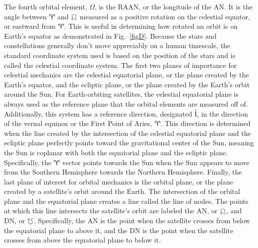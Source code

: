 \documentclass[conference]{IEEEtran}
\newcommand{\vhat}[1]{\hat{\bm{\mathrm{#1}}}}
\begin{document}
			The fourth orbital element, \( \Omega \), is the RAAN, or the longitude of the AN\@. It is the angle between \( \aries \) and \( \ascnode \) measured as a positive rotation on the celestial equator, or eastward from \( \aries \). This is useful in determining how rotated an orbit is on Earth's equator as demonstrated in Fig.~\ref{figD}. Because the stars and constellations generally don't move appreciably on a human timescale, the standard coordinate system used is based on the position of the stars and is called the celestial coordinate system. The first two planes of importance for celestial mechanics are the celestial equatorial plane, or the plane created by the Earth's equator, and the ecliptic plane, or the plane created by the Earth's orbit around the Sun. For Earth-orbiting satellites, the celestial equatorial plane is always used as the reference plane that the orbital elements are measured off of. Additionally, this system has a reference direction, designated \( \vhat{I} \), in the direction of the vernal equinox or the First Point of Aries, \( \aries \). This direction is determined when the line created by the intersection of the celestial equatorial plane and the ecliptic plane perfectly points toward the gravitational center of the Sun, meaning the Sun is coplanar with both the equatorial plane and the ecliptic plane. Specifically, the \( \aries \) vector points towards the Sun when the Sun appears to move from the Southern Hemisphere towards the Northern Hemisphere. Finally, the last plane of interest for orbital mechanics is the orbital plane, or the plane created by a satellite's orbit around the Earth. The intersection of the orbital plane and the equatorial plane creates a line called the line of nodes. The points at which this line intersects the satellite's orbit are labeled the AN, or \( \ascnode \), and DN, or \( \descnode \). Specifically, the AN is the point when the satellite crosses from below the equatorial plane to above it, and the DN is the point when the satellite crosses from above the equatorial plane to below it.
\end{document}
